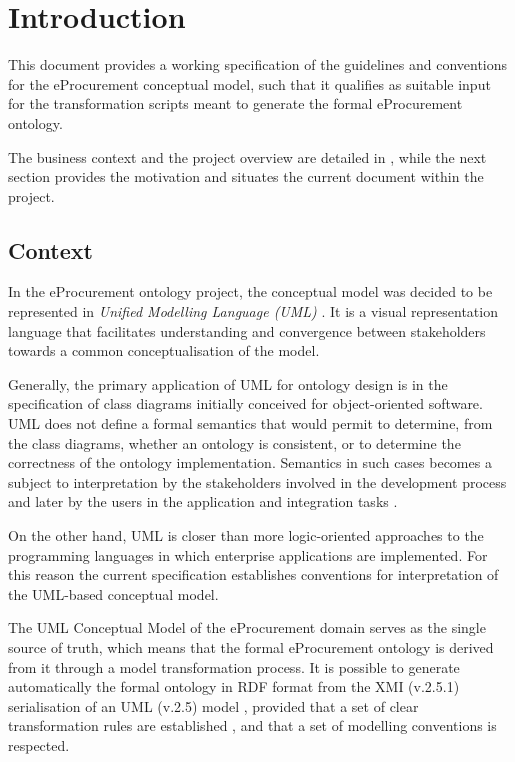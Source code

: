 \section{Introduction}
\label{sec:introduction}
	
	This document provides a working specification of the guidelines and conventions for the eProcurement conceptual model, such that it qualifies as suitable input for the transformation scripts meant to generate the formal eProcurement ontology. 
	
	The business context and the project overview are detailed in \citet{costetchi2020a}, while the next section provides the motivation and situates the current document within the project.
	
	\subsection{Context}
	
	In the eProcurement ontology project, the conceptual model was decided \cite{d2.01-2017} to be represented in \textit{Unified Modelling Language (UML)} \citep{uml-userguide}. It is a visual representation language that facilitates understanding and convergence between stakeholders towards a common conceptualisation of the model. 
	
	Generally, the primary application of UML \citep{fowler2004} for ontology design is in the specification of class diagrams initially conceived for object-oriented software. UML does not define a formal semantics that would permit to determine, from the class diagrams, whether an ontology is consistent, or to determine the correctness of the ontology implementation. Semantics in such cases becomes a subject to interpretation by  the stakeholders involved in the development process and later by the users in the application and integration tasks \cite{grunninger2003}.
	
	On the other hand, UML is closer than more logic-oriented approaches to the programming languages in which enterprise applications are implemented. For this reason the current specification establishes conventions for interpretation of the UML-based conceptual model.
		
	The UML Conceptual Model of the eProcurement domain serves as the single source of truth, which means that the formal eProcurement ontology is derived from it through a model transformation process. It is possible to generate automatically the formal ontology in RDF format \cite{rdf11} from the XMI (v.2.5.1) serialisation \cite{xmi2.5.1} of an UML (v.2.5) model \cite{uml2.5}, provided that a set of clear transformation rules are established \citep{costetchi2020c}, and that a set of modelling conventions is respected.
				
